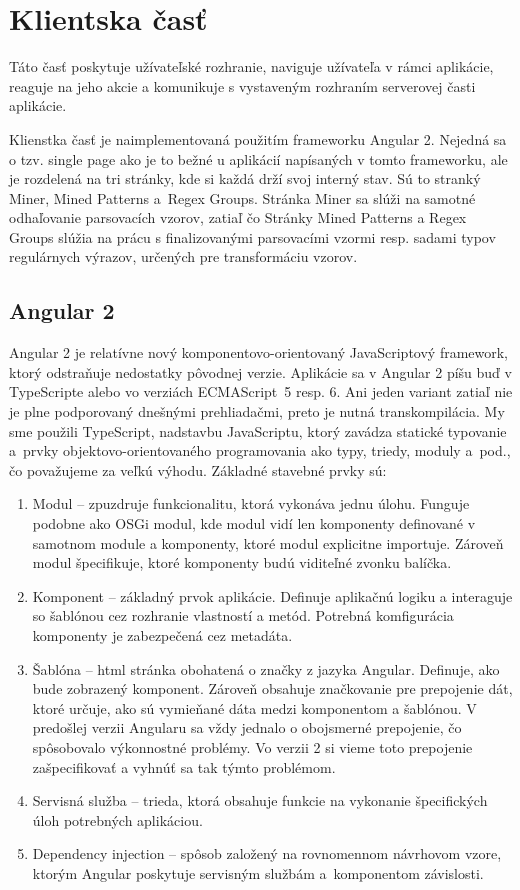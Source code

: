 \chapter{Klientska časť}
Táto časť poskytuje užívateľské rozhranie, naviguje užívateľa v rámci aplikácie, reaguje na jeho akcie a komunikuje s vystaveným rozhraním serverovej časti aplikácie.
\par Klienstka časť je naimplementovaná použitím frameworku Angular 2. Nejedná sa o tzv. single page ako je to bežné u aplikácií napísaných v tomto frameworku, ale je rozdelená na tri stránky, kde si každá drží svoj interný stav. Sú to stranký Miner, Mined Patterns a~Regex Groups. Stránka Miner sa slúži na samotné odhaľovanie parsovacích vzorov, zatiaľ čo Stránky Mined Patterns a Regex Groups slúžia na prácu s finalizovanými parsovacími vzormi resp. sadami typov regulárnych výrazov, určených pre transformáciu vzorov.


\section{Angular 2}
Angular 2 je relatívne nový komponentovo-orientovaný JavaScriptový framework, ktorý odstraňuje nedostatky pôvodnej verzie. Aplikácie sa v Angular 2 píšu buď v TypeScripte alebo vo verziách \mbox{ECMAScript}~5 resp. 6. Ani jeden variant zatiaľ nie je plne podporovaný dnešnými prehliadačmi, preto je nutná transkompilácia. My sme použili TypeScript, nadstavbu JavaScriptu, ktorý zavádza statické typovanie a~prvky objektovo-orientovaného programovania ako typy, triedy, moduly a~pod., čo považujeme za veľkú výhodu. Základné stavebné prvky sú:

\begin{enumerate}
 \item Modul -- zpuzdruje funkcionalitu, ktorá vykonáva jednu úlohu. Funguje podobne ako OSGi modul, kde modul vidí len komponenty definované v samotnom module a komponenty, ktoré modul explicitne importuje. Zároveň modul špecifikuje, ktoré komponenty budú viditeľné zvonku balíčka.
 \item Komponent -- základný prvok aplikácie. Definuje aplikačnú logiku a interaguje so šablónou cez rozhranie vlastností a metód. Potrebná komfigurácia komponenty je zabezpečená cez metadáta.
 \item Šablóna -- html stránka obohatená o značky z jazyka Angular. Definuje, ako bude zobrazený komponent. Zároveň obsahuje značkovanie pre prepojenie dát, ktoré určuje, ako sú vymieňané dáta medzi komponentom a šablónou. V predošlej verzii Angularu sa vždy jednalo o obojsmerné prepojenie, čo spôsobovalo výkonnostné problémy. Vo verzii 2 si vieme toto prepojenie zašpecifikovať a vyhnúť sa tak týmto problémom.
 \item Servisná služba -- trieda, ktorá obsahuje funkcie na vykonanie špecifických úloh potrebných aplikáciou.
 \item Dependency injection -- spôsob založený na rovnomennom návr\-hovom vzore, ktorým Angular poskytuje servisným službám a~komponentom závislosti.
\end{enumerate}

